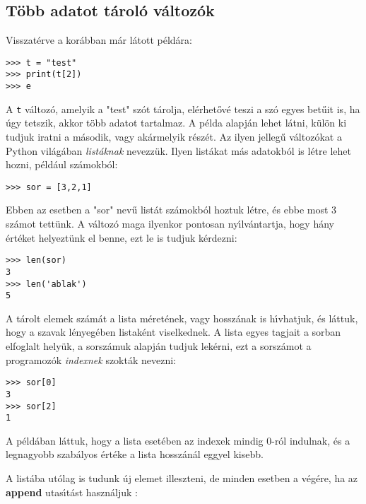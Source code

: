 \documentclass[12pt]{article}
\begin{document}
\subsection{T\"obb adatot t\'arol\'o v\'altoz\'ok}

Visszat\'erve a kor\'abban m\'ar l\'atott p\'eld\'ara:

\begin{Verbatim}[fontsize=\small]
>>> t = "test"
>>> print(t[2])
>>> e
\end{Verbatim}

\noindent A {\tt t} v\'altoz\'o, amelyik a "test" sz\'ot t\'arolja, el\'erhet\H{o}v\'e teszi a sz\'o egyes 
bet\H{u}it is, ha \'ugy tetszik, akkor t\"obb adatot tartalmaz. A p\'elda alapj\'an lehet l\'atni, 
k\"ul\"on ki tudjuk iratni a m\'asodik, vagy ak\'armelyik r\'esz\'et. Az ilyen jelleg\H{u} v\'altoz\'okat 
a Python vil\'ag\'aban {\sl list\'aknak}  nevezz\"uk. Ilyen list\'akat m\'as adatokb\'ol is 
l\'etre lehet hozni, p\'eld\'aul sz\'amokb\'ol:

\begin{Verbatim}[fontsize=\small]
>>> sor = [3,2,1]
\end{Verbatim}

\noindent Ebben az esetben a "sor" nev\H{u} list\'at sz\'amokb\'ol hoztuk l\'etre, \'es ebbe most 3 sz\'amot tett\"unk. 
A v\'altoz\'o maga ilyenkor pontosan ny\'{\i}lv\'antartja, hogy h\'any \'ert\'eket helyezt\"unk el benne, 
ezt le is tudjuk k\'erdezni:

\begin{Verbatim}[fontsize=\small]
>>> len(sor)
3
>>> len('ablak')
5
\end{Verbatim}

\noindent A t\'arolt elemek sz\'am\'at a lista m\'eret\'enek, vagy hossz\'anak is h\'{\i}vhatjuk, \'es l\'attuk, 
hogy a szavak l\'enyeg\'eben listak\'ent viselkednek. A lista egyes tagjait a sorban elfoglalt hely\"uk, a 
sorsz\'amuk alapj\'an tudjuk lek\'erni, ezt a sorsz\'amot a programoz\'ok {\sl indexnek}  szokt\'ak 
nevezni:

\begin{Verbatim}[fontsize=\small]
>>> sor[0]
3
>>> sor[2]
1
\end{Verbatim}

\noindent A p\'eld\'aban l\'attuk, hogy a lista eset\'eben az indexek mindig 0-r\'ol indulnak, \'es a legnagyobb 
szab\'alyos \'ert\'eke a lista hossz\'an\'al eggyel kisebb. 

A list\'aba ut\'olag is tudunk \'uj elemet illeszteni, de minden esetben a v\'eg\'ere, ha az {\bf append} 
utas\'{\i}t\'ast haszn\'aljuk :
\end{document}
